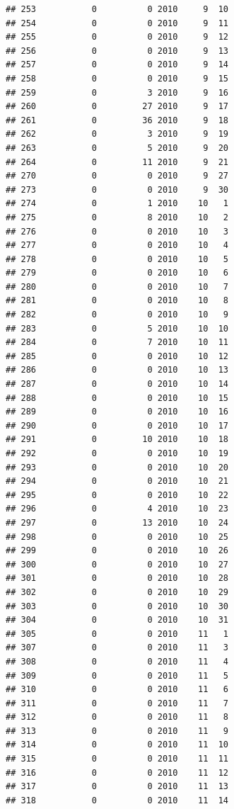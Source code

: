 \documentclass[
]{article}
\begin{document}
\begin{verbatim}
## 253           0          0 2010     9  10
## 254           0          0 2010     9  11
## 255           0          0 2010     9  12
## 256           0          0 2010     9  13
## 257           0          0 2010     9  14
## 258           0          0 2010     9  15
## 259           0          3 2010     9  16
## 260           0         27 2010     9  17
## 261           0         36 2010     9  18
## 262           0          3 2010     9  19
## 263           0          5 2010     9  20
## 264           0         11 2010     9  21
## 270           0          0 2010     9  27
## 273           0          0 2010     9  30
## 274           0          1 2010    10   1
## 275           0          8 2010    10   2
## 276           0          0 2010    10   3
## 277           0          0 2010    10   4
## 278           0          0 2010    10   5
## 279           0          0 2010    10   6
## 280           0          0 2010    10   7
## 281           0          0 2010    10   8
## 282           0          0 2010    10   9
## 283           0          5 2010    10  10
## 284           0          7 2010    10  11
## 285           0          0 2010    10  12
## 286           0          0 2010    10  13
## 287           0          0 2010    10  14
## 288           0          0 2010    10  15
## 289           0          0 2010    10  16
## 290           0          0 2010    10  17
## 291           0         10 2010    10  18
## 292           0          0 2010    10  19
## 293           0          0 2010    10  20
## 294           0          0 2010    10  21
## 295           0          0 2010    10  22
## 296           0          4 2010    10  23
## 297           0         13 2010    10  24
## 298           0          0 2010    10  25
## 299           0          0 2010    10  26
## 300           0          0 2010    10  27
## 301           0          0 2010    10  28
## 302           0          0 2010    10  29
## 303           0          0 2010    10  30
## 304           0          0 2010    10  31
## 305           0          0 2010    11   1
## 307           0          0 2010    11   3
## 308           0          0 2010    11   4
## 309           0          0 2010    11   5
## 310           0          0 2010    11   6
## 311           0          0 2010    11   7
## 312           0          0 2010    11   8
## 313           0          0 2010    11   9
## 314           0          0 2010    11  10
## 315           0          0 2010    11  11
## 316           0          0 2010    11  12
## 317           0          0 2010    11  13
## 318           0          0 2010    11  14

\end{verbatim}
\end{document}
